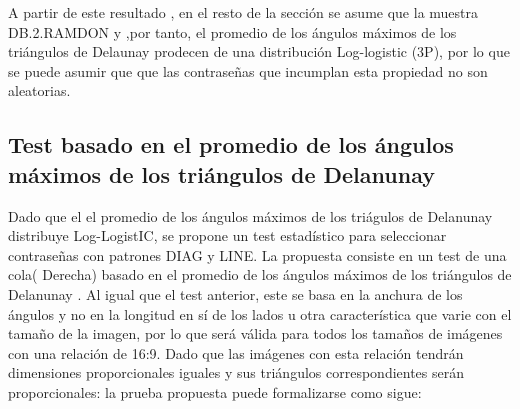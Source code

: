 \documentclass[12pt]{report}
\begin{document}
A partir de este resultado , en el resto de la sección se asume que la muestra  DB.2.RAMDON y ,por tanto, el promedio de los ángulos máximos de los triángulos de Delaunay  prodecen de una distribución Log-logistic (3P), por lo que se puede asumir que que las contraseñas que incumplan esta propiedad no son aleatorias.

\subsection{Test basado en el promedio de los ángulos máximos de los triángulos de Delanunay}
Dado  que el el promedio de los ángulos máximos de los triágulos de Delanunay distribuye Log-LogistIC, se propone un  test estadístico para seleccionar contraseñas con patrones DIAG y LINE. La propuesta consiste en un test de una cola( Derecha) basado en el promedio de los ángulos máximos de los triángulos de Delanunay .
Al igual que  el test anterior, este se basa en la anchura de los ángulos y no en la longitud en sí de los lados u otra característica que varie con el tamaño de la imagen, por lo que será válida para todos los tamaños de imágenes con una relación de 16:9. Dado que las imágenes con esta relación tendrán dimensiones proporcionales iguales y sus triángulos correspondientes serán proporcionales: la prueba propuesta puede formalizarse como sigue:
\end{document}
